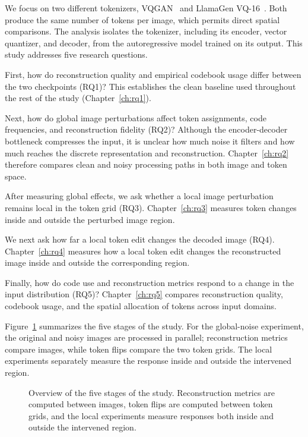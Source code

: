 We focus on two different tokenizers, VQGAN~\cite{esser2021taming} and LlamaGen
VQ-16~\cite{sun2024llamagen}. Both produce the same number of tokens per image,
which permits direct spatial comparisons. The analysis isolates the tokenizer,
including its encoder, vector quantizer, and decoder, from the autoregressive
model trained on its output. This study addresses five research questions.

First, how do reconstruction quality and empirical codebook usage differ between
the two checkpoints (RQ1)? This
establishes the clean baseline used throughout the rest of the study
(Chapter~\ref{ch:rq1}).

Next, how do global image perturbations affect token assignments, code
frequencies, and reconstruction fidelity (RQ2)? Although the
encoder-decoder bottleneck compresses the input, it is unclear how much noise it
filters and how much reaches the discrete representation and reconstruction.
Chapter~\ref{ch:rq2} therefore compares clean and noisy processing paths in both
image and token space.

After measuring global effects, we ask whether a local image perturbation
remains local in the token grid (RQ3). Chapter~\ref{ch:rq3} measures token changes
inside and outside the perturbed image region.

We next ask how far a local token edit changes the decoded image (RQ4).
Chapter~\ref{ch:rq4} measures how a local token edit changes the reconstructed
image inside and outside the corresponding region.

Finally, how do code use and reconstruction metrics respond to a change in the
input distribution (RQ5)?
Chapter~\ref{ch:rq5} compares reconstruction quality, codebook usage, and the
spatial allocation of tokens across input domains.

Figure~\ref{fig:tokenizer_probe_taxonomy} summarizes the five stages of the
study. For the global-noise experiment, the original and noisy images are processed in
parallel; reconstruction metrics compare images, while token flips compare the
two token grids. The local experiments separately measure the response inside
and outside the intervened region.

\begin{figure}[t]
    \centering
    \resizebox{\textwidth}{!}{}
    \caption{Overview of the five stages of the study. Reconstruction metrics are
    computed between images, token flips are computed between token grids, and
    the local experiments measure responses both inside and outside the intervened
    region.}
    \label{fig:tokenizer_probe_taxonomy}
\end{figure}

